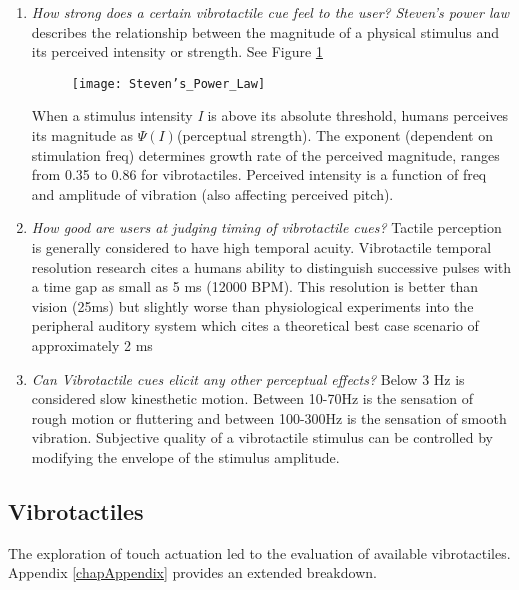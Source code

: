 \begin{enumerate}
    \item \emph{How strong does a certain vibrotactile cue feel to the user?}
\textit{Steven's power law} describes the relationship between the magnitude of a physical stimulus and its perceived intensity or strength. See Figure \ref{fig:StevensPowerLaw}
\begin{figure}[H]
    \texttt{[image: Steven's\_Power\_Law]}
    \label{fig:StevensPowerLaw}
\end{figure}
When a stimulus intensity \textit{I} is above its absolute threshold, humans perceives its magnitude as \begin{math}\Psi(I)\end{math}(perceptual strength). The exponent (dependent on stimulation freq) determines growth rate of the perceived magnitude, ranges from 0.35 to 0.86 for vibrotactiles. Perceived intensity is a function of freq and amplitude of vibration (also affecting perceived pitch).
    \item \emph{How good are users at judging timing of vibrotactile cues?}
Tactile perception is generally considered to have high temporal acuity.
Vibrotactile temporal resolution research cites a humans ability to distinguish successive pulses with a time gap as small as 5 ms (12000 BPM). This resolution is better than vision (25ms) but slightly worse than physiological experiments into the peripheral auditory system which cites a theoretical best case scenario of approximately 2 ms \cite{fishbach2001auditory} \cite{parsons2006neurobiology}
    \item \emph{Can Vibrotactile cues elicit any other perceptual effects?} Below 3 Hz is considered slow kinesthetic motion. Between 10-70Hz is the sensation of rough motion or fluttering and between 100-300Hz is the sensation of smooth vibration. Subjective quality of a vibrotactile stimulus can be controlled by modifying the envelope of the stimulus amplitude.
\end{enumerate}

\subsection{Vibrotactiles}
The exploration of touch actuation led to the evaluation of available vibrotactiles. Appendix \ref{chapAppendix} provides an extended breakdown.

